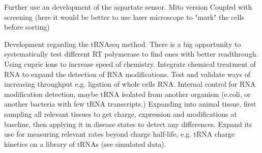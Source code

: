 Further use an development of the aspartate sensor.
Mito version
Coupled with screening (here it would be better to use laser microscope to "mark" the cells before sorting)


Development regarding the tRNAseq method.
There is a big opportunity to systematically test different RT polymerase to find ones with better readthrough.
Using cupric ions to increase speed of chemistry.
Integrate chemical treatment of RNA to expand the detection of RNA modifications.
Test and validate ways of increasing throughput e.g. ligation of whole cells RNA.
Internal control for RNA modification detection, maybe tRNA isolated from another organism (e.coli, or another bacteria with few tRNA transcripts.)
Expanding into animal tissue, first sampling all relevant tissues to get charge, expression and modifications at baseline, then applying it in disease states to detect any differences.
Expand its use for measuring relevant rates beyond charge half-life, e.g. tRNA charge kinetics on a library of tRNAs (see simulated data).






